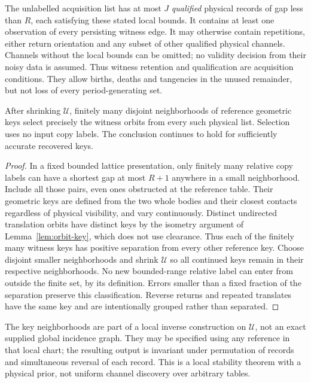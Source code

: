 The unlabelled acquisition list has at most $J$ \emph{qualified} physical
records of gap less than $R$, each satisfying these stated local bounds.
It contains at least one observation of every persisting witness edge.
It may otherwise contain repetitions, either return orientation and any
subset of other qualified physical channels. Channels without the local
bounds can be omitted; no validity decision from their noisy data is
assumed. Thus witness retention and qualification are acquisition
conditions. They allow births, deaths and tangencies in the unused
remainder, but not loss of every period-generating set.

\begin{lemma}
\label{lem:witness-isolation}
After shrinking $\mathcal U$, finitely many disjoint neighborhoods of
reference geometric keys select precisely the witness orbits from every
such physical list. Selection uses no input copy labels. The conclusion
continues to hold for sufficiently accurate recovered keys.
\end{lemma}
\begin{proof}
In a fixed bounded lattice presentation, only finitely many relative
copy labels can have a shortest gap at most $R+1$ anywhere in a small
neighborhood. Include all those pairs, even ones obstructed at the
reference table. Their geometric keys are defined from the two whole
bodies and their closest contacts regardless of physical visibility,
and vary continuously. Distinct undirected translation orbits have
distinct keys by the isometry argument of Lemma~\ref{lem:orbit-key},
which does not use clearance. Thus each of the finitely many witness
keys has positive separation from every other reference key. Choose
disjoint smaller neighborhoods and shrink $\mathcal U$ so all continued
keys remain in their respective neighborhoods. No new bounded-range
relative label can enter from outside the finite set, by its definition.
Errors smaller than a fixed fraction of the separation preserve this
classification. Reverse returns and repeated translates have the same
key and are intentionally grouped rather than separated.
\end{proof}

The key neighborhoods are part of a local inverse construction on
$\mathcal U$, not an exact supplied global incidence graph. They may be
specified using any reference in that local chart; the resulting output
is invariant under permutation of records and simultaneous reversal of
each record. This is a local stability theorem with a physical prior,
not uniform channel discovery over arbitrary tables.

